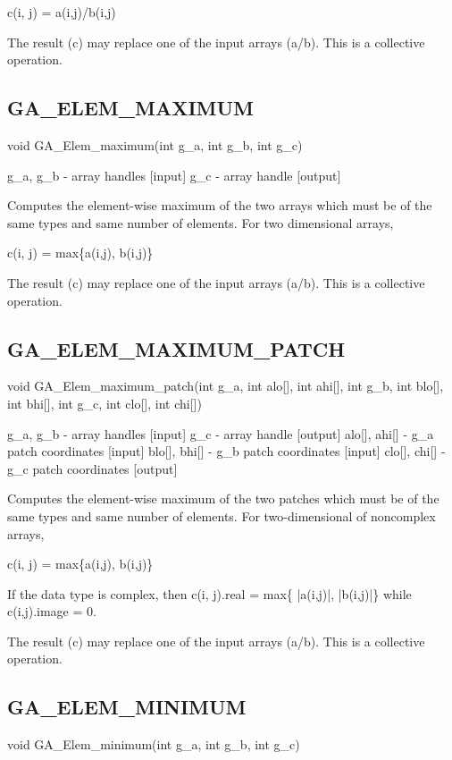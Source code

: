 c(i, j) = a(i,j)/b(i,j)

The result (c) may replace one of the input arrays (a/b). This is
a collective operation. 


\subsection*{GA\_ELEM\_MAXIMUM}

void GA\_Elem\_maximum(int g\_a, int g\_b, int g\_c)

g\_a, g\_b - array handles {[}input{]} g\_c - array handle {[}output{]}

Computes the element-wise maximum of the two arrays which must be
of the same types and same number of elements. For two dimensional
arrays,

c(i, j) = max\{a(i,j), b(i,j)\}

The result (c) may replace one of the input arrays (a/b). This is
a collective operation. 


\subsection*{GA\_ELEM\_MAXIMUM\_PATCH}

void GA\_Elem\_maximum\_patch(int g\_a, int alo{[}{]}, int ahi{[}{]},
int g\_b, int blo{[}{]}, int bhi{[}{]}, int g\_c, int clo{[}{]}, int
chi{[}{]})

g\_a, g\_b - array handles {[}input{]} g\_c - array handle {[}output{]}
alo{[}{]}, ahi{[}{]} - g\_a patch coordinates {[}input{]} blo{[}{]},
bhi{[}{]} - g\_b patch coordinates {[}input{]} clo{[}{]}, chi{[}{]}
- g\_c patch coordinates {[}output{]}

Computes the element-wise maximum of the two patches which must be
of the same types and same number of elements. For two-dimensional
of noncomplex arrays,

c(i, j) = max\{a(i,j), b(i,j)\}

If the data type is complex, then c(i, j).real = max\{ |a(i,j)|, |b(i,j)|\}
while c(i,j).image = 0.

The result (c) may replace one of the input arrays (a/b). This is
a collective operation. 


\subsection*{GA\_ELEM\_MINIMUM}

void GA\_Elem\_minimum(int g\_a, int g\_b, int g\_c)

